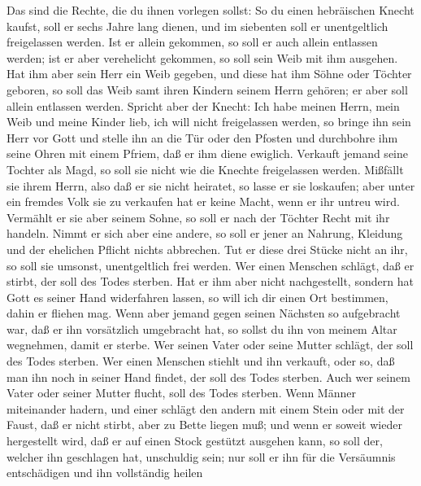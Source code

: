  Das sind die Rechte, die du ihnen vorlegen sollst:
 So du einen hebräischen Knecht kaufst, soll er sechs
Jahre lang dienen, und im siebenten soll er unentgeltlich freigelassen
werden.  Ist er allein gekommen, so soll er auch allein
entlassen werden; ist er aber verehelicht gekommen, so soll sein Weib
mit ihm ausgehen.  Hat ihm aber sein Herr ein Weib
gegeben, und diese hat ihm Söhne oder Töchter geboren, so soll das Weib
samt ihren Kindern seinem Herrn gehören; er aber soll allein entlassen
werden.  Spricht aber der Knecht: Ich habe meinen Herrn,
mein Weib und meine Kinder lieb,  ich will nicht
freigelassen werden, so bringe ihn sein Herr vor Gott und stelle ihn an
die Tür oder den Pfosten und durchbohre ihm seine Ohren mit einem
Pfriem, daß er ihm diene ewiglich.  Verkauft jemand seine
Tochter als Magd, so soll sie nicht wie die Knechte freigelassen werden.
 Mißfällt sie ihrem Herrn, also daß er sie nicht heiratet,
so lasse er sie loskaufen; aber unter ein fremdes Volk sie zu verkaufen
hat er keine Macht, wenn er ihr untreu wird.  Vermählt er
sie aber seinem Sohne, so soll er nach der Töchter Recht mit ihr
handeln.  Nimmt er sich aber eine andere, so soll er
jener an Nahrung, Kleidung und der ehelichen Pflicht nichts abbrechen.
 Tut er diese drei Stücke nicht an ihr, so soll sie
umsonst, unentgeltlich frei werden.  Wer einen Menschen
schlägt, daß er stirbt, der soll des Todes sterben.  Hat
er ihm aber nicht nachgestellt, sondern hat Gott es seiner Hand
widerfahren lassen, so will ich dir einen Ort bestimmen, dahin er
fliehen mag.  Wenn aber jemand gegen seinen Nächsten so
aufgebracht war, daß er ihn vorsätzlich umgebracht hat, so sollst du ihn
von meinem Altar wegnehmen, damit er sterbe.  Wer seinen
Vater oder seine Mutter schlägt, der soll des Todes sterben.
 Wer einen Menschen stiehlt und ihn verkauft, oder so,
daß man ihn noch in seiner Hand findet, der soll des Todes sterben.
 Auch wer seinem Vater oder seiner Mutter flucht, soll
des Todes sterben.  Wenn Männer miteinander hadern, und
einer schlägt den andern mit einem Stein oder mit der Faust, daß er
nicht stirbt, aber zu Bette liegen muß;  und wenn er
soweit wieder hergestellt wird, daß er auf einen Stock gestützt ausgehen
kann, so soll der, welcher ihn geschlagen hat, unschuldig sein; nur soll
er ihn für die Versäumnis entschädigen und ihn vollständig heilen
